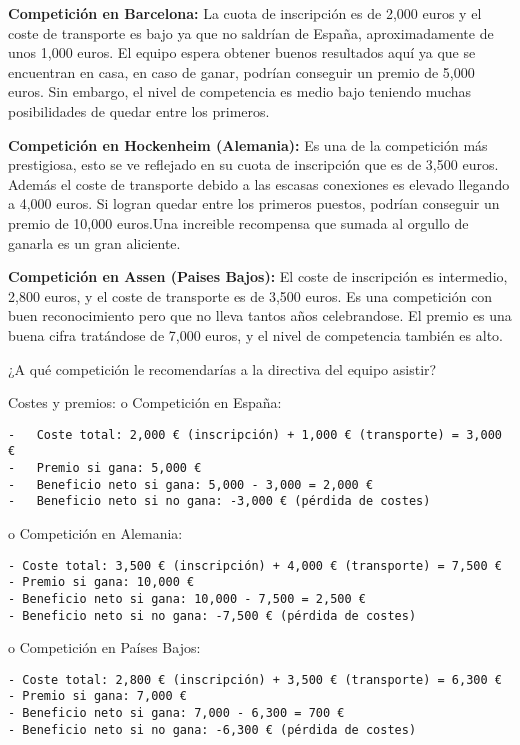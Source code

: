 \documentclass[
]{article}
\begin{document}
\textbf{Competición en Barcelona:} La cuota de inscripción es de 2,000
euros y el coste de transporte es bajo ya que no saldrían de España,
aproximadamente de unos 1,000 euros. El equipo espera obtener buenos
resultados aquí ya que se encuentran en casa, en caso de ganar, podrían
conseguir un premio de 5,000 euros. Sin embargo, el nivel de competencia
es medio bajo teniendo muchas posibilidades de quedar entre los
primeros.

\textbf{Competición en Hockenheim (Alemania):} Es una de la competición
más prestigiosa, esto se ve reflejado en su cuota de inscripción que es
de 3,500 euros. Además el coste de transporte debido a las escasas
conexiones es elevado llegando a 4,000 euros. Si logran quedar entre los
primeros puestos, podrían conseguir un premio de 10,000 euros.Una
increible recompensa que sumada al orgullo de ganarla es un gran
aliciente.

\textbf{Competición en Assen (Paises Bajos):} El coste de inscripción es
intermedio, 2,800 euros, y el coste de transporte es de 3,500 euros. Es
una competición con buen reconocimiento pero que no lleva tantos años
celebrandose. El premio es una buena cifra tratándose de 7,000 euros, y
el nivel de competencia también es alto.

¿A qué competición le recomendarías a la directiva del equipo asistir?

Costes y premios: o Competición en España:

\begin{verbatim}
-   Coste total: 2,000 € (inscripción) + 1,000 € (transporte) = 3,000 €
-   Premio si gana: 5,000 €
-   Beneficio neto si gana: 5,000 - 3,000 = 2,000 €
-   Beneficio neto si no gana: -3,000 € (pérdida de costes)
\end{verbatim}

o Competición en Alemania:

\begin{verbatim}
- Coste total: 3,500 € (inscripción) + 4,000 € (transporte) = 7,500 €
- Premio si gana: 10,000 €
- Beneficio neto si gana: 10,000 - 7,500 = 2,500 €
- Beneficio neto si no gana: -7,500 € (pérdida de costes)
\end{verbatim}

o Competición en Países Bajos:

\begin{verbatim}
- Coste total: 2,800 € (inscripción) + 3,500 € (transporte) = 6,300 €
- Premio si gana: 7,000 €
- Beneficio neto si gana: 7,000 - 6,300 = 700 €
- Beneficio neto si no gana: -6,300 € (pérdida de costes)
\end{verbatim}
\end{document}
